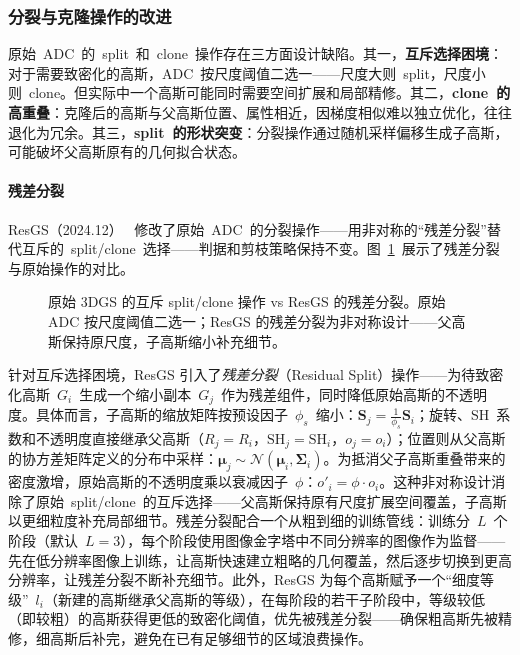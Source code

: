 \subsubsection{分裂与克隆操作的改进}

原始~ADC~的~split~和~clone~操作存在三方面设计缺陷。其一，\textbf{互斥选择困境}：对于需要致密化的高斯，ADC~按尺度阈值二选一——尺度大则~split，尺度小则~clone。但实际中一个高斯可能同时需要空间扩展和局部精修。其二，\textbf{clone~的高重叠}：克隆后的高斯与父高斯位置、属性相近，因梯度相似难以独立优化，往往退化为冗余。其三，\textbf{split~的形状突变}：分裂操作通过随机采样偏移生成子高斯，可能破坏父高斯原有的几何拟合状态。

\paragraph{残差分裂}

ResGS（2024.12）~\cite{2412_07494} 修改了原始~ADC~的分裂操作——用非对称的“残差分裂”替代互斥的~split/clone~选择——判据和剪枝策略保持不变。图~\ref{fig:02_resgs}~展示了残差分裂与原始操作的对比。

\begin{figure}[htbp]
\centering
\resizebox{0.85\textwidth}{!}{}
\caption{原始 3DGS 的互斥 split/clone 操作 vs ResGS 的残差分裂。原始 ADC 按尺度阈值二选一；ResGS 的残差分裂为非对称设计——父高斯保持原尺度，子高斯缩小补充细节。}
\label{fig:02_resgs}
\end{figure}

针对互斥选择困境，ResGS 引入了\emph{残差分裂}（Residual Split）操作——为待致密化高斯~$G_i$~生成一个缩小副本~$G_j$~作为残差组件，同时降低原始高斯的不透明度。具体而言，子高斯的缩放矩阵按预设因子~$\phi_s$~缩小：$\mathbf{S}_j = \frac{1}{\phi_s}\mathbf{S}_i$；旋转、SH~系数和不透明度直接继承父高斯（$R_j = R_i$，$\text{SH}_j = \text{SH}_i$，$o_j = o_i$）；位置则从父高斯的协方差矩阵定义的分布中采样：$\boldsymbol{\mu}_j \sim \mathcal{N}(\boldsymbol{\mu}_i, \boldsymbol{\Sigma}_i)$。为抵消父子高斯重叠带来的密度激增，原始高斯的不透明度乘以衰减因子~$\phi$：$o'_i = \phi \cdot o_i$。这种非对称设计消除了原始~split/clone~的互斥选择——父高斯保持原有尺度扩展空间覆盖，子高斯以更细粒度补充局部细节。残差分裂配合一个从粗到细的训练管线：训练分~$L$~个阶段（默认~$L{=}3$），每个阶段使用图像金字塔中不同分辨率的图像作为监督——先在低分辨率图像上训练，让高斯快速建立粗略的几何覆盖，然后逐步切换到更高分辨率，让残差分裂不断补充细节。此外，ResGS 为每个高斯赋予一个``细度等级''~$l_i$（新建的高斯继承父高斯的等级），在每阶段的若干子阶段中，等级较低（即较粗）的高斯获得更低的致密化阈值，优先被残差分裂——确保粗高斯先被精修，细高斯后补完，避免在已有足够细节的区域浪费操作。


